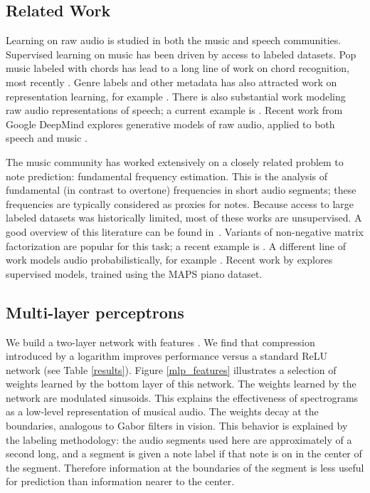 \documentclass{article} \usepackage{iclr2017_conference,times}
\begin{document}
\subsection{Related Work}

Learning on raw audio is studied in both the music and speech communities. Supervised learning on music has been driven by access to labeled datasets. Pop music labeled with chords \citep{harte} has lead to a long line of work on chord recognition, most recently \cite{chords}. Genre labels and other metadata has also attracted work on representation learning, for example \cite{dieleman}. There is also substantial work modeling raw audio representations of speech; a current example is \cite{rawspeech}. Recent work from Google DeepMind explores generative models of raw audio, applied to both speech and music \citep{wavenet}.

The music community has worked extensively on a closely related problem to note prediction: fundamental frequency estimation. This is the analysis of fundamental (in contrast to overtone) frequencies in short audio segments; these frequencies are typically considered as proxies for notes. Because access to large labeled datasets was historically limited, most of these works are unsupervised. A good overview of this literature can be found in~\cite{klapuri}. Variants of non-negative matrix factorization are popular for this task; a recent example is \cite{nmf}. A different line of work models audio probabilistically, for example \cite{kirkpatrick}. Recent work by \cite{kelz16} explores supervised models, trained using the MAPS piano dataset.

\subsection{Multi-layer perceptrons}

We build a two-layer network with features . We find that compression introduced by a logarithm improves performance versus a standard ReLU network (see Table \ref{results}). Figure \ref{mlp_features} illustrates a selection of weights  learned by the bottom layer of this network. The weights learned by the network are modulated sinusoids. This explains the effectiveness of spectrograms as a low-level representation of musical audio. The weights decay at the boundaries, analogous to Gabor filters in vision. This behavior is explained by the labeling methodology: the audio segments used here are approximately  of a second long, and a segment is given a note label if that note is on in the center of the segment. Therefore information at the boundaries of the segment is less useful for prediction than information nearer to the center.
\end{document}
